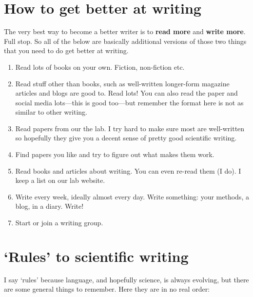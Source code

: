 \documentclass[11pt,letter]{article}
\begin{document}
\section{How to get better at writing}

The very best way to become a better writer is to {\bf read more} and {\bf write more}. Full stop. So all of the below are basically additional versions of those two things that you need to do get better at writing. 
\begin{enumerate}
\item Read lots of books on your own. Fiction, non-fiction etc. 
\item Read stuff other than books, such as well-written longer-form magazine articles and blogs are good to. Read lots! You can also read the paper and social media lots---this is good too---but remember the format here is not as similar to other writing. 
\item Read papers from our the lab. I try hard to make sure most are well-written so hopefully they give you a decent sense of pretty good scientific writing.
\item Find papers you like and try to figure out what makes them work. 
\item Read books and articles about writing. You can even re-read them (I do). I keep a list on our lab website.
\item Write every week, ideally almost every day. Write something: your methods, a blog, in a diary. Write!
\item Start or join a writing group. 
\end{enumerate}


\section{`Rules' to scientific writing}

I say `rules' because language, and hopefully science, is always evolving, but there are some general things to remember. Here they are in no real order:
\end{document}

